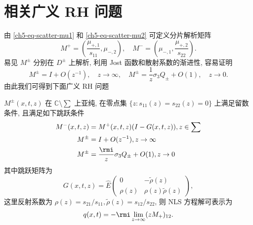 \section{相关广义 RH 问题}
由 \eqref{ch5-eq-scatter-mu1} 和 \eqref{ch5-eq-scatter-mu2} 可定义分片解析矩阵
\begin{equation}
    M^{+} = (\frac{\mu_{+,1}}{s_{11}}, \mu_{-,2}), \quad M^{-} = (\mu_{-,1}, \frac{\mu_{+,2}}{s_{22}}).
\end{equation}
易见 $M^{\pm}$ 分别在 $D^{\pm}$ 上解析, 利用 Jost 函数和散射系数的渐进性, 容易证明
\begin{equation}
    M^{\pm} = I + O(z^{-1}), \quad z \to \infty,
    \quad M^{\pm} = \frac{1}{z} \sigma_{3} Q_{\pm} + O(1), \quad z \to 0.
\end{equation}
由此我们可得到下面广义 RH 问题
\begin{theorem}
    $ M^{\pm}(x,t,z) $ 在 $ \mathbb{C} \setminus \sum $ 上亚纯, 在零点集 $ \{z : s_{11}(z) = s_{22}(z) = 0 \} $ 上满足留数条件, 且满足如下跳跃条件
    \begin{align}
        M^{-}(x,t,z) & = M^{+}(x,t,z) (I - G(x,t,z)), z \in \sum \label{ch5-eq-rh-jump} \\
        M^{\pm}      & = I + O(z^{-1}), z \to \infty                                    \\
        M^{\pm}      & = \frac{\rmi}{z} \sigma_{3} Q_{\pm} + O(1), z \to 0
    \end{align}
    其中跳跃矩阵为
    \begin{equation}
        G(x,t,z) = \hat{E} \begin{pmatrix} 0 & -\tilde{\rho}(z) \\ \rho(z) & \rho(z) \tilde{\rho}(z) \end{pmatrix},
    \end{equation}
    这里反射系数为 $ \rho(z) = s_{21}/s_{11}, \tilde{\rho}(z) = s_{12}/s_{22} $, 则 NLS 方程解可表示为
    \begin{equation}
        q(x,t) = -\rmi \lim_{z \to \infty} (z M_{+})_{12}.
    \end{equation}
\end{theorem}
